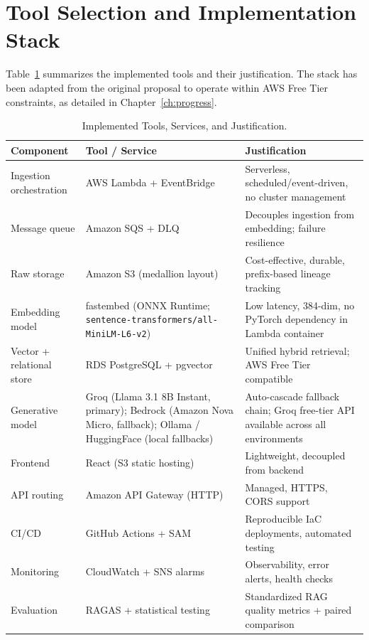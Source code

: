 \section{Tool Selection and Implementation Stack}
\label{sec:tools}

Table~\ref{tab:tools} summarizes the implemented tools and their justification. The stack has been adapted from the original proposal to operate within AWS Free Tier constraints, as detailed in Chapter~\ref{ch:progress}.

\begin{table}[H]
\caption{Implemented Tools, Services, and Justification.}
\label{tab:tools}
\centering
\begin{tabular}{p{3.2cm}p{3.2cm}p{6.6cm}}
\toprule
\textbf{Component} & \textbf{Tool / Service} & \textbf{Justification} \\
\midrule
Ingestion orchestration & AWS Lambda + EventBridge & Serverless, scheduled/event-driven, no cluster management \\
Message queue & Amazon SQS + DLQ & Decouples ingestion from embedding; failure resilience \\
Raw storage & Amazon S3 (medallion layout) & Cost-effective, durable, prefix-based lineage tracking \\
Embedding model & fastembed (ONNX Runtime; 
\texttt{sentence-transformers/all-MiniLM-L6-v2}) & Low latency, 384-dim, no PyTorch dependency in Lambda container \\
Vector + relational store & RDS PostgreSQL + pgvector & Unified hybrid retrieval; AWS Free Tier compatible \\
Generative model & Groq (Llama 3.1 8B Instant, primary); Bedrock (Amazon Nova Micro, fallback); Ollama / HuggingFace (local fallbacks) & Auto-cascade fallback chain; Groq free-tier API available across all environments \\
Frontend & React (S3 static hosting) & Lightweight, decoupled from backend \\
API routing & Amazon API Gateway (HTTP) & Managed, HTTPS, CORS support \\
CI/CD & GitHub Actions + SAM & Reproducible IaC deployments, automated testing \\
Monitoring & CloudWatch + SNS alarms & Observability, error alerts, health checks \\
Evaluation & RAGAS + statistical testing & Standardized RAG quality metrics + paired comparison \\
\bottomrule
\end{tabular}
\end{table}

